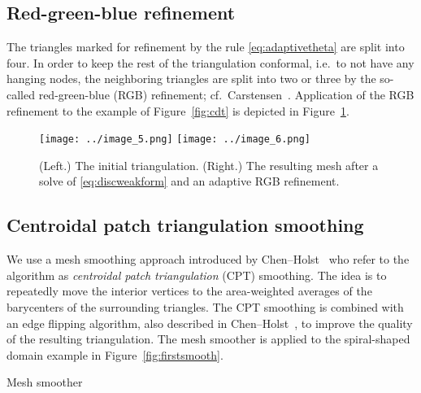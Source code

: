 \documentclass[11pt]{article}
\begin{document}
\subsection{Red-green-blue refinement}
\label{sec:rgb}

The triangles marked for refinement by the rule \eqref{eq:adaptivetheta} are
split into four.  In order to keep the rest of the triangulation conformal,
i.e.~to not have any hanging nodes, the neighboring triangles are split into two or
three by the so-called red-green-blue (RGB)
refinement; cf.~Carstensen~\cite{carstensen2004adaptive}.
Application of the RGB refinement to the example of Figure~\ref{fig:cdt}
is depicted in Figure~\ref{fig:firstrgb}.

\begin{figure}[htbp]
\centering
\texttt{[image: ../image\_5.png]}
\texttt{[image: ../image\_6.png]}
\caption{(Left.) The initial triangulation. (Right.) The resulting mesh
after a solve of \eqref{eq:discweakform} and an adaptive RGB refinement.}
\label{fig:firstrgb}
\end{figure}

\subsection{Centroidal patch triangulation smoothing}
\label{sec:cpt}

We use a mesh smoothing approach introduced by Chen--Holst~\cite{Chen_2011} who
refer to the algorithm as \emph{centroidal patch triangulation} (CPT) smoothing.
The idea is to repeatedly move the interior vertices to the area-weighted
averages of the barycenters of the surrounding triangles.  The CPT smoothing is
combined with an edge flipping algorithm, also described in
Chen--Holst~\cite{Chen_2011}, to improve the quality of the resulting
triangulation.  The mesh smoother is applied to the spiral-shaped domain example 
in Figure~\ref{fig:firstsmooth}.

\begin{algorithm}[H]
  \caption{Mesh smoother}
  \begin{algorithmic}[1]
    \Statex
    \EndFor
    \State {}
    \EndFunction
  \end{algorithmic}
\end{algorithm}
\end{document}
